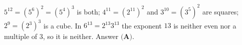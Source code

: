 $5^{12}=(5^6)^2=(5^4)^3$ is both; $4^{11}=(2^{11})^2$ and $3^{10}=(3^5)^2$ are squares; $2^9=(2^3)^3$ is a cube. In $6^{13}=2^{13}3^{13}$ the exponent $13$ is neither even nor a multiple of $3$, so it is neither. Answer $\boxed{\textbf{(A)}}$.
